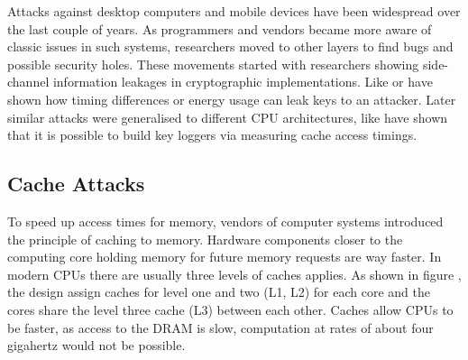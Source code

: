 Attacks against desktop computers and mobile devices have been widespread over
the last couple of years. As programmers and vendors became more aware of
classic issues in such systems, researchers moved to other layers to find bugs
and possible security holes. These movements started with researchers showing
side-channel information leakages in cryptographic implementations. Like
 or  have shown how timing differences or energy usage can leak keys to an
attacker. Later similar attacks were generalised to different CPU architectures,
like  have shown that it is possible to
build key loggers via measuring cache access timings.

\subsection{Cache Attacks}

To speed up access times for memory, vendors of computer systems introduced the
principle of caching  to memory. Hardware
components closer to the computing core holding memory for future memory
requests are way faster. In modern CPUs  there are usually three levels of caches applies. As shown in figure
, the design assign caches for level one and two
(L1, L2) for each core and the cores share the level three cache (L3) between
each other. Caches allow CPUs to be faster, as access to the DRAM is slow,
computation at rates of about four gigahertz would not be possible.

